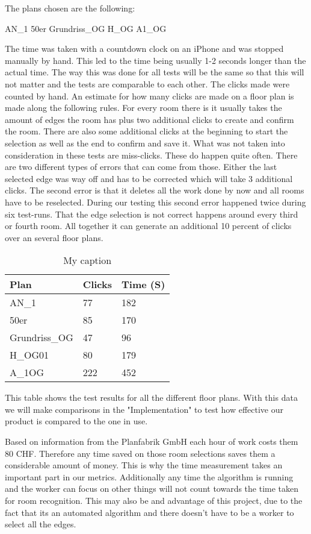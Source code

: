 The plans chosen are the following:

AN\_1
50er
Grundriss\_OG
H\_OG
A1\_OG

The time was taken with a countdown clock on an iPhone and was stopped manually by hand. This led to the time being usually 1-2 seconds longer than the actual time. The way this was done for all tests will be the same so that this will not matter and the tests are comparable to each other. The clicks made were counted by hand.
An estimate for how many clicks are made on a floor plan is made along the following rules. For every room there is it usually takes the amount of edges the room has plus two additional clicks to create and confirm the room. There are also some additional clicks at the beginning to start the selection as well as the end to confirm and save it.
What was not taken into consideration in these tests are miss-clicks. These do happen quite often. There are two different types of errors that can come from those. Either the last selected edge was way off and has to be corrected which will take 3 additional clicks. The second error is that it deletes all the work done by now and all rooms have to be reselected. During our testing this second error happened twice during six test-runs. That the edge selection is not correct happens around every third or fourth room. All together it can generate an additional 10 percent of clicks over an several floor plans.


\begin{table}[]
	\centering
	\caption{My caption}
	\label{my-label}
	\begin{tabular}{@{}lll@{}}
		\toprule
		Plan          & Clicks & Time (S) \\ \midrule
		AN\_1         & 77     & 182 \\
		50er          & 85     & 170  \\
		Grundriss\_OG & 47     & 96 \\
		H\_OG01         & 80     & 179 \\
		A\_1OG        & 222    & 452 \\ \bottomrule
	\end{tabular}
\end{table}

This table shows the test results for all the different floor plans. With this data we will make comparisons in the "Implementation" to test how effective our product is compared to the one in use.

Based on information from the Planfabrik GmbH each hour of work costs them 80 CHF. Therefore any time saved on those room selections saves them a considerable amount of money. This is why the time measurement takes an important part in our metrics. Additionally any time the algorithm is running and the worker can focus on other things will not count towards the time taken for room recognition. This may also be and advantage of this project, due to the fact that its an automated algorithm and there doesn't have to be a worker to select all the edges. 

